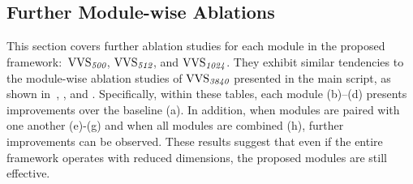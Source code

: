\documentclass[10pt,twocolumn,letterpaper]{article}
\begin{document}
    \subsection{Further Module-wise Ablations} \label{further_abl}
        This section covers further ablation studies for each module in the proposed framework:~$\textup{VVS}_{\textit{500}}$, $\textup{VVS}_{\textit{512}}$, and $\textup{VVS}_{\textit{1024}}$. They exhibit similar tendencies to the module-wise ablation studies of $\textup{VVS}_{\textit{3840}}$ presented in the main script, as shown in~, , and . Specifically, within these tables, each module (b)–(d) presents improvements over the baseline (a). In addition, when modules are paired with one another (e)-(g) and when all modules are combined (h), further improvements can be observed. These results suggest that even if the entire framework operates with reduced dimensions, the proposed modules are still effective.

    
    
\end{document}
